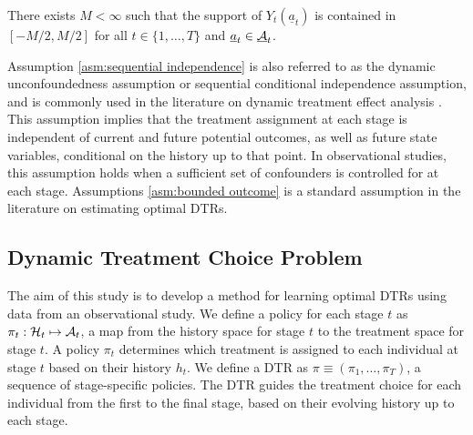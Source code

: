 
\begin{assumption}\label{asm:bounded outcome}
There exists $M <\infty$ such that the support of $Y_{t}(\underline{a}_{t})$ is
contained in $\left[-M/2,M/2\right]$ for all $t \in \{1,\ldots,T\}$ and $\underline{a}_{t} \in \underline{\mathcal{A}}_{t}$.
\end{assumption}


\medskip


Assumption \ref{asm:sequential independence} is also referred to as the dynamic unconfoundedness assumption or sequential conditional independence assumption, and is commonly used in the literature on dynamic treatment effect analysis \citep{Robins_1997,Murphy_2003}. This assumption implies that the treatment assignment at each stage is independent of current and future potential outcomes, as well as future state variables, conditional on the history up to that point. In observational studies, this assumption holds when a sufficient set of confounders is controlled for at each stage. Assumptions \ref{asm:bounded outcome} is a standard assumption in the literature on estimating optimal DTRs.


\subsection{Dynamic Treatment Choice Problem\label{sec:dynamic treatment choice problem}}

The aim of this study is  to develop a method for learning optimal DTRs using data from an observational study. We define a policy for each stage $t$ as $\pi_{t}:\mathcal{H}_{t}\mapsto \mathcal{A}_{t} $, a map from the history space for stage $t$ to the treatment space for stage $t$. A policy $\pi_t$ determines which treatment is assigned to each individual at stage $t$ based on their history $h_t$. We define a DTR as $\pi \equiv (\pi_{1}, \ldots, \pi_{T})$, a sequence of stage-specific policies. The DTR guides the treatment choice for each individual from the first to the final stage, based on their evolving history up to each stage.

